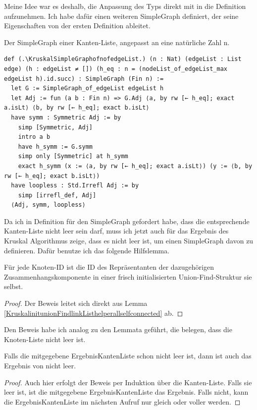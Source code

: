 Meine Idee war es deshalb, die Anpassung des Typs direkt mit in die Definition aufzunehmen.
Ich habe dafür einen weiteren SimpleGraph definiert, der seine Eigenschaften von der ersten Definition ableitet.

\begin{definition}[\KruskalSimpleGraphofnofedgeList]\label{KruskalSimpleGraphofnofedgeList}
  Der SimpleGraph einer Kan\-ten-Liste, angepasst an eine natürliche Zahl n.
\end{definition}
\begin{lstlisting}
def (.\KruskalSimpleGraphofnofedgeList.) (n : Nat) (edgeList : List edge) (h : edgeList ≠ []) (h_eq : n = (nodeList_of_edgeList_max edgeList h).id.succ) : SimpleGraph (Fin n) :=
  let G := SimpleGraph_of_edgeList edgeList h
  let Adj := fun (a b : Fin n) => G.Adj ⟨a, by rw [← h_eq]; exact a.isLt⟩ ⟨b, by rw [← h_eq]; exact b.isLt⟩
  have symm : Symmetric Adj := by
    simp [Symmetric, Adj]
    intro a b
    have h_symm := G.symm
    simp only [Symmetric] at h_symm
    exact h_symm (x := ⟨a, by rw [← h_eq]; exact a.isLt⟩) (y := ⟨b, by rw [← h_eq]; exact b.isLt⟩)
  have loopless : Std.Irrefl Adj := by
    simp [irrefl_def, Adj]
  ⟨Adj, symm, loopless⟩
\end{lstlisting}

Da ich in Definition für den SimpleGraph gefordert habe, dass die entsprechende Kanten-Liste nicht leer sein darf,
muss ich jetzt auch für das Ergebnis des Kruskal Algorithmus zeige, dass es nicht leer ist, um einen SimpleGraph davon zu definieren.
Dafür benutze ich das folgende Hilfslemma.

\begin{lemma}[\KruskalconnectedcomponentofinitunionFindofideqid]
  Für jede Knoten-ID ist die ID des Repräsentanten der dazugehörigen Zusammenhangskomponente in einer frisch initialisierten Union-Find-Struktur sie selbst.
\end{lemma}
\begin{proof}
  Der Beweis leitet sich direkt aus Lemma \ref{KruskalinitunionFindlinkListhelperallselfconnected} ab.
\end{proof}

Den Beweis habe ich analog zu den Lemmata geführt, die belegen, dass die Knoten-Liste nicht leer ist.

\begin{lemma}[\Kruskalkruskalhelpernonempty]
  Falls die mitgegebene ErgebnisKantenListe schon nicht leer ist, dann ist auch das Ergebnis von \Kruskalkruskalhelper nicht leer.
\end{lemma}
\begin{proof}
  Auch hier erfolgt der Beweis per Induktion über die Kanten-Liste.
  Falls sie leer ist, ist die mitgegebene ErgebnisKantenListe das Ergebnis.
  Falls nicht, kann die ErgebnisKantenListe im nächsten Aufruf nur gleich oder voller werden.
\end{proof}




